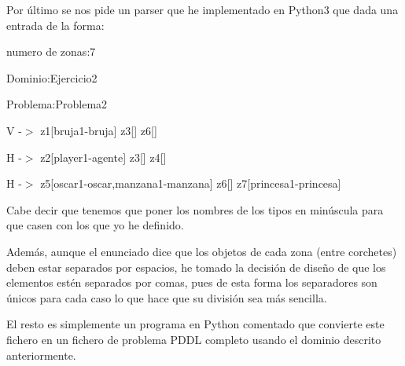 \documentclass[12pt,a4paper]{article}
\begin{document}
Por último se nos pide un parser que he implementado en Python3 que dada una entrada de la forma:

numero de zonas:7

Dominio:Ejercicio2

Problema:Problema2

V -$>$ z1[bruja1-bruja] z3[] z6[]

H -$>$ z2[player1-agente] z3[] z4[]

H -$>$ z5[oscar1-oscar,manzana1-manzana] z6[] z7[princesa1-princesa]

Cabe decir que tenemos que poner los nombres de los tipos en minúscula para que casen con los que yo he definido. 

Además, aunque el enunciado dice que los objetos de cada zona (entre corchetes) deben estar separados por espacios, he tomado la decisión de diseño de que los elementos estén separados por comas, pues de  esta forma los separadores son únicos para cada caso lo que hace que su división sea más sencilla.

El resto es simplemente un programa en Python comentado que convierte este fichero en un fichero de problema PDDL completo usando el dominio descrito anteriormente.
\end{document}
